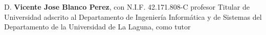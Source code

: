 \documentclass[spanish,a4paper,14pt,twoside]{report}
\begin{document}




            



\newpage{\pagestyle{empty}\cleardoublepage}

D. \textbf{Vicente Jose Blanco Perez}, con N.I.F. 42.171.808-C profesor Titular de Universidad adscrito al Departamento de Ingeniería Informática y de Sistemas del Departamento de la Universidad de La Laguna, como tutor \\
\vspace*{0.6in}
\end{document}
